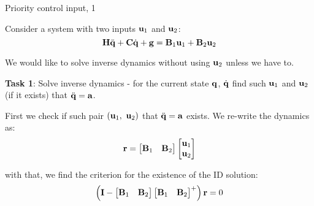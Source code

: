 \documentclass{beamer}
\begin{document}
\begin{frame}{Priority control input, 1}
	\begin{flushleft}
		
		
		Consider a system with two inputs $\mathbf{u}_1$ and $\mathbf{u}_2$:
		\begin{equation}
			\mathbf{H} \ddot{\mathbf{q}} + \mathbf{C}\dot{\mathbf{q}} + \mathbf{g} = \mathbf{B}_1\mathbf{u}_1 + \mathbf{B}_2\mathbf{u}_2
		\end{equation}		
		
		We would like to solve inverse dynamics without using $\mathbf{u}_2$ unless we have to.
		
		\textbf{Task 1}:  Solve inverse dynamics - for the current state $\mathbf{q}$, $\dot{\mathbf{q}}$ find such $\mathbf{u}_1$ and $\mathbf{u}_2$ (if it exists) that $\ddot{\mathbf{q}} = \mathbf{a}$.
		
		First we check if such pair $(\bo{u}_1, \ \bo{u}_2)$ that $\ddot{\mathbf{q}} = \mathbf{a}$ exists. We re-write the dynamics as:
		\begin{equation}
			\mathbf{r} = 
			\begin{bmatrix}
				\mathbf{B}_1 & \mathbf{B}_2
			\end{bmatrix}
			\begin{bmatrix}
			\mathbf{u}_1 \\ \mathbf{u}_2
			\end{bmatrix}
		\end{equation}		
		
		with that, we find the criterion for the existence of the ID solution:
		\begin{equation}
			\left
			(\mathbf{I} - \begin{bmatrix}
				\mathbf{B}_1 & \mathbf{B}_2
			\end{bmatrix}
			\begin{bmatrix}
				\mathbf{B}_1 & \mathbf{B}_2
			\end{bmatrix}^+
			\right) \mathbf{r} 
		= 0
		\end{equation}		
		
		
	\end{flushleft}
\end{frame}
\end{document}
